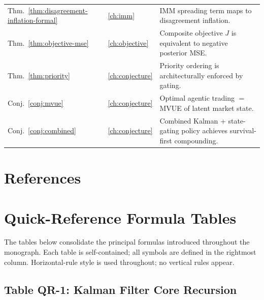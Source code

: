 \documentclass[12pt,openany]{book}
\numberwithin{equation}{chapter}
\theoremstyle{plain}
\theoremstyle{definition}
\theoremstyle{remark}
\begin{document}
\begin{table}[H]
\begin{tabularx}{\linewidth}{@{} l l X @{}}
Thm.~\ref{thm:disagreement-inflation-formal}
  & \ref{ch:imm}
  & IMM spreading term maps to disagreement inflation. \\
Thm.~\ref{thm:objective-mse}
  & \ref{ch:objective}
  & Composite objective $J$ is equivalent to negative posterior MSE. \\
Thm.~\ref{thm:priority}
  & \ref{ch:conjecture}
  & Priority ordering is architecturally enforced by gating. \\
Conj.~\ref{conj:mvue}
  & \ref{ch:conjecture}
  & Optimal agentic trading $=$ MVUE of latent market state. \\
Conj.~\ref{conj:combined}
  & \ref{ch:conjecture}
  & Combined Kalman + state-gating policy achieves survival-first compounding. \\
\bottomrule
\end{tabularx}
\end{table}



\chapter*{References}

\chapter*{Quick-Reference Formula Tables}
\label{ch:formula-tables}

\noindent
The tables below consolidate the principal formulas introduced
throughout the monograph.  Each table is self-contained; all
symbols are defined in the rightmost column.  Horizontal-rule
style is used throughout; no vertical rules appear.

\section*{Table QR-1: Kalman Filter Core Recursion}
\end{document}
